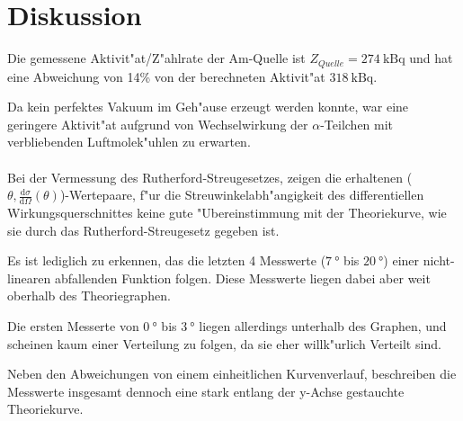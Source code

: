 \section{Diskussion}
\label{sec:Diskussion}
  Die gemessene Aktivit"at/Z"ahlrate der Am-Quelle ist $Z_{Quelle}=\SI{274}{\kilo \becquerel}$ und hat eine Abweichung von 14\% von der berechneten Aktivit"at $\SI{318}{\kilo \becquerel}$.
  
  Da kein perfektes Vakuum im Geh"ause erzeugt werden konnte, war eine geringere Aktivit"at aufgrund von Wechselwirkung der $\alpha$-Teilchen mit verbliebenden Luftmolek"uhlen zu erwarten.\\
  \\Bei der Vermessung des Rutherford-Streugesetzes, zeigen die erhaltenen ($\theta,\frac{\text{d}\sigma}{\text{d}\Omega}(\theta)$)-Wertepaare, f"ur die Streuwinkelabh"angigkeit des differentiellen Wirkungsquerschnittes keine gute "Ubereinstimmung mit der Theoriekurve, wie sie durch das Rutherford-Streugesetz gegeben ist.

  Es ist lediglich zu erkennen, das die letzten 4 Messwerte ($\SI{7}{\degree}$ bis $\SI{20}{\degree}$) einer nicht-linearen abfallenden Funktion folgen.
  Diese Messwerte liegen dabei aber weit oberhalb des Theoriegraphen.

  Die ersten Messerte von $\SI{0}{\degree}$ bis $\SI{3}{\degree}$ liegen allerdings unterhalb des Graphen, und scheinen kaum einer Verteilung zu folgen, da sie eher willk"urlich Verteilt sind.

  Neben den Abweichungen von einem einheitlichen Kurvenverlauf, beschreiben die Messwerte insgesamt dennoch eine stark entlang der y-Achse gestauchte Theoriekurve.
